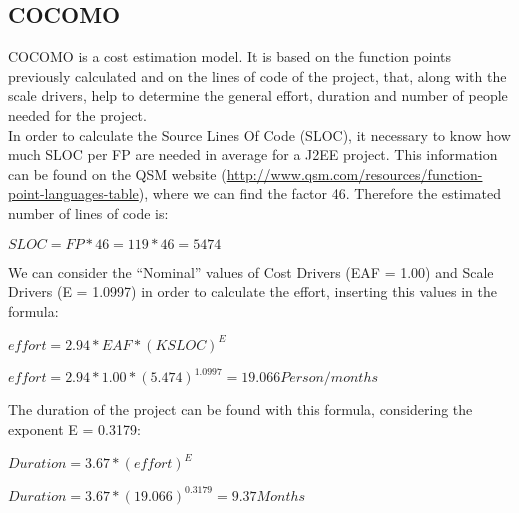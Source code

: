 	\subsection{COCOMO}
		COCOMO is a cost estimation model. It is based on the function points previously calculated and on the lines of code of the project, that, along with the scale drivers, help to determine the general effort, duration and number of people needed for the project.\\
		In order to calculate the Source Lines Of Code (SLOC), it necessary to know how much SLOC per FP are needed in average for a J2EE project. This information can be found on the QSM website (\url{http://www.qsm.com/resources/function-point-languages-table}), where we can find the factor 46. Therefore the estimated number of lines of code is:
		\vspace{0.5cm}	
		\begin{center}
			\begin{math}
				SLOC = FP * 46 = 119 * 46 = 5474
			\end{math}
		\end{center}
		\vspace{0.5cm}
		We can consider the “Nominal” values of Cost Drivers (EAF = 1.00) and Scale Drivers (E = 1.0997) in order to calculate the effort, inserting this values in the formula:
		\vspace{0.5cm}
		\begin{center}
			\begin{math}
				effort = 2.94*EAF*(KSLOC)^{E}
			\end{math}
		\end{center}
		\begin{center}
			\begin{math}
				effort = 2.94*1.00*(5.474)^{1.0997} = 19.066 Person/months
			\end{math}
		\end{center}
		\vspace{0.5cm}
		The duration of the project can be found with this formula, considering the exponent E = 0.3179:
		\vspace{0.5cm}
		\begin{center}
			\begin{math}
				Duration = 3.67*(effort)^{E}
			\end{math}
		\end{center}
		\begin{center}
			\begin{math}
				Duration = 3.67*(19.066)^{0.3179} = 9.37 Months
			\end{math}
		\end{center}
